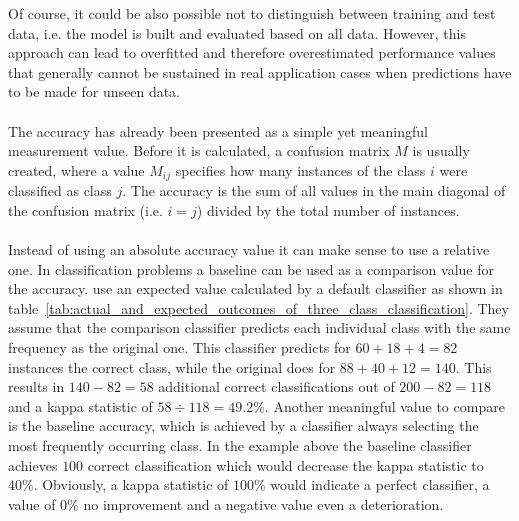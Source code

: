 \documentclass[article,type=msc,colorback,accentcolor=tud7b]{tudthesis}
\begin{document}
    Of course, it could be also possible not to distinguish between training and test data, i.e. the model is built and evaluated based on all data. However, this approach can lead to overfitted and therefore overestimated performance values that generally cannot be sustained in real application cases when predictions have to be made for unseen data. \\\\
    The accuracy has already been presented as a simple yet meaningful measurement value. Before it is calculated, a confusion matrix $M$ is usually created, where a value $M_{ij}$ specifies how many instances of the class $i$ were classified as class $j$. The accuracy is the sum of all values in the main diagonal of the confusion matrix (i.e. $i=j$) divided by the total number of instances. \\\\
Instead of using an absolute accuracy value it can make sense to use a relative one. In classification problems a baseline can be used as a comparison value for the accuracy. \citeauthor{Witten2005} use an expected value calculated by a default classifier as shown in table~\ref{tab:actual_and_expected_outcomes_of_three_class_classification}. They assume that the comparison classifier predicts each individual class with the same frequency as the original one. This classifier predicts for $60+18+4=82$ instances the correct class, while the original does for $88+40+12=140$. This results in $140-82=58$ additional correct classifications out of $200-82=118$ and a kappa statistic of $58\div118=49.2\%$. Another meaningful value to compare is the baseline accuracy, which is achieved by a classifier always selecting the most frequently occurring class. In the example above the baseline classifier achieves $100$ correct classification which would decrease the kappa statistic to $40\%$. Obviously, a kappa statistic of $100\%$ would indicate a perfect classifier, a value of $0\%$ no improvement and a negative value even a deterioration.
  
\end{document}
